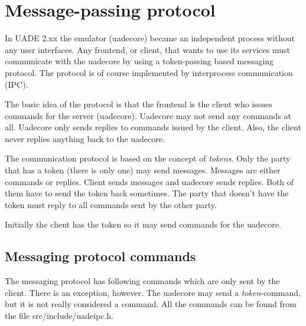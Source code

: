 \documentclass{article}
\begin{document}
\section{Message-passing protocol}
In UADE 2.xx the emulator (uadecore) became an independent process without
any user interfaces. Any frontend, or client, that wants to use its services
must communicate with the uadecore by using a token-passing based messaging
protocol. The protocol is of course implemented by interprocess communication
(IPC).

The basic idea of the protocol is that the frontend is the client
who issues commands for the server (uadecore). Uadecore may not send any
commands at all. Uadecore only sends replies to commands issued by the
client. Also, the client never replies anything back to the
uadecore.

The communication protocol is based on the concept of
\emph{tokens}. Only the party that has a token (there is only one) may
send messages. Messages are either commands or replies. Client sends
messages and uadecore sends replies. Both of them have to send the token back
sometimes. The party that doesn't have the token must reply to all commands
sent by the other party.

Initially the client has the token so it may send commands for the uadecore.

\subsection{Messaging protocol commands}

The messaging protocol has following commands which are only sent by
the client. There is an exception, however. The uadecore may send a
\emph{token}-command, but it is not really considered a command.
All the commands can be found from the file \mbox{src/include/uadeipc.h}.
\end{document}
